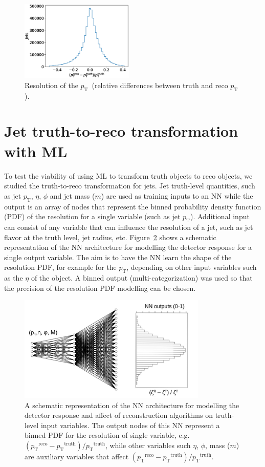 \documentclass[showpacs,showkeys,preprint,prd,nofootinbib,linenumbers,12pt,superscriptaddress]{revtex4-1}
\def\pt{\ensuremath{p_{\mathrm{T}}}}
\def\ptRes{\ensuremath{(\pt^{\mathrm{reco}}-\pt^{\mathrm{truth}})/\pt^{\mathrm{truth}}}}
\begin{document}
\begin{figure}[h]
  \includegraphics[width=0.48\textwidth]{figures/nn/pTRes_nobounds_prescaling.eps}
  \caption{Resolution of the \pt\ (relative differences between truth and reco \pt).}
  \label{fig:deltaTarget}
\end{figure}

\FloatBarrier
\section{Jet truth-to-reco transformation with ML}
\label{sec:mlMethod}
To test the viability of using ML to transform truth objects to reco objects, we studied the truth-to-reco transformation for jets. Jet truth-level quantities, such as jet $\pt$, $\eta$, $\phi$ and jet mass ($m$) are used as training inputs to an NN while the output
is an array of nodes that represent the binned probability density function (PDF) of the resolution for a single variable (such as jet \pt). Additional input can consist of any variable that can influence the resolution of a jet, such as jet flavor at the truth level, jet radius, etc. Figure~\ref{ann_example} shows a schematic representation of the NN architecture for modelling the detector response for a single output variable. The aim is to have the NN learn the shape of the resolution PDF, for example for the $\pt$, depending on other input variables such as the $\eta$ of the object. A binned output (multi-categorization) was used so that the precision of the resolution PDF modelling can be chosen.

\begin{figure}[h]
  \includegraphics[width=0.8\textwidth]{figures/intro/nn_example.pdf}
  \caption{A schematic representation of the NN architecture for modelling the detector response and affect of reconstruction algorithms on truth-level input variables. The output nodes of this NN represent a binned PDF for the resolution of single variable, e.g. \ptRes, while other variables such $\eta$, $\phi$, mass ($m$) are auxiliary variables that affect \ptRes.}
  \label{ann_example}
\end{figure}
\end{document}
